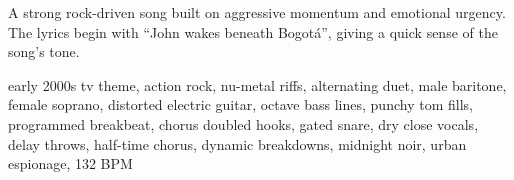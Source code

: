 

\begin{notes}
A strong rock-driven song built on aggressive momentum and emotional urgency. %
The lyrics begin with “John wakes beneath Bogotá”, giving a quick sense of the song’s tone.
\end{notes}

\begin{style}
early 2000s tv theme, action rock, nu-metal riffs, alternating duet, male baritone, female soprano, distorted electric guitar, octave bass lines, punchy tom fills, programmed breakbeat, chorus doubled hooks, gated snare, dry close vocals, delay throws, half-time chorus, dynamic breakdowns, midnight noir, urban espionage, 132 BPM
\end{style}

